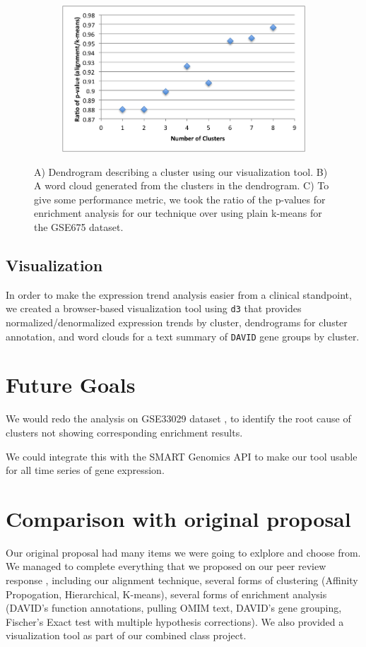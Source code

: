 \documentclass[aps,prd,final,onecolumn,a4paper,10pt]{revtex4}
\begin{document}
\begin{figure}[H]
  \begin{subfigure}[b]{0.8\textwidth}
    \includegraphics[width=.7\textwidth]{pvalue_performace.png}
    \label{fig:pvalue}
  \end{subfigure}%
  \label{fig:enrichment}
  \caption{A) Dendrogram describing a cluster using our visualization tool. B) A word cloud generated from the clusters in the dendrogram. C) To give some performance metric, we took the ratio of the p-values for enrichment analysis for our technique over using plain k-means for the GSE675 dataset.}
\end{figure}


\subsection{Visualization}

In order to make the expression trend analysis easier from a clinical standpoint, we created a browser-based visualization tool using \verb!d3! that provides normalized/denormalized expression trends by cluster, dendrograms for cluster annotation, and word clouds for a text summary of \verb!DAVID! gene groups by cluster.

\section{Future Goals}
We would redo the analysis on GSE33029 dataset , to identify the root cause of clusters not showing corresponding enrichment results. 

We could integrate this with the SMART Genomics API to make our tool usable for all time series of gene expression.

\section{Comparison with original proposal} 
Our original proposal had many items we were going to exlplore and choose from.
We managed to complete everything that we proposed on our peer review response , including our alignment technique, several forms of clustering (Affinity Propogation, Hierarchical, K-means), several forms of enrichment analysis (DAVID's function annotations, pulling OMIM text, DAVID's gene grouping, Fischer's Exact test with multiple hypothesis corrections). We also provided a visualization tool as part of our combined class project.
\end{document}
